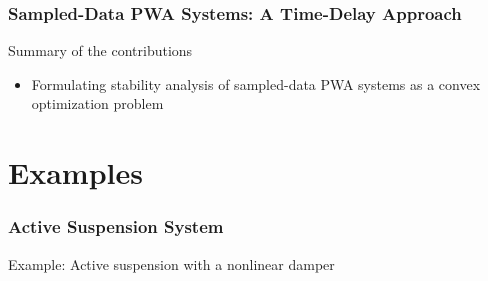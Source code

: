 \documentclass{beamer}
\begin{document}
  \frame
  {  
    \frametitle{Sampled-Data PWA Systems: A Time-Delay Approach}
	Summary of the contributions
    \begin{itemize}
    \item Formulating stability analysis of sampled-data PWA systems as a convex optimization problem
   \end{itemize}
  }

\section[]{Examples}
  \frame
  {
    \frametitle{Active Suspension System}
    Example: Active suspension with a nonlinear damper
    \centerline{}
  }
\end{document}
